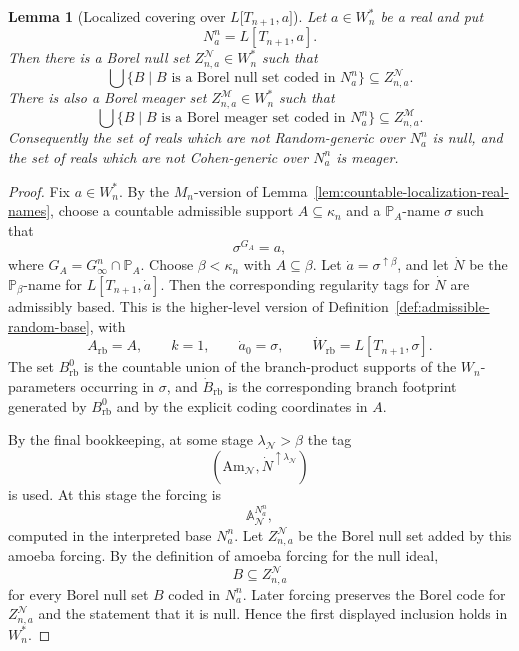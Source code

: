 \documentclass[a4paper,11pt]{article}
\newtheorem{lemma}[theorem]{Lemma}
\begin{document}
\begin{lemma}[Localized covering over \(L\lbrack T_{n+1},a\rbrack\)]\label{lem:random-cohen-covering-mn}
Let \(a\in W_n^\ast\) be a real and put
\[
   N^n_a=L[T_{n+1},a].
\]
Then there is a Borel null set \(Z^{\mathcal N}_{n,a}\in W_n^\ast\) such that
\[
   \bigcup\{B\mid B\text{ is a Borel null set coded in }N^n_a\}
   \subseteq Z^{\mathcal N}_{n,a}.
\]
There is also a Borel meager set \(Z^{\mathcal M}_{n,a}\in W_n^\ast\) such that
\[
   \bigcup\{B\mid B\text{ is a Borel meager set coded in }N^n_a\}
   \subseteq Z^{\mathcal M}_{n,a}.
\]
Consequently the set of reals which are not Random-generic over \(N^n_a\) is
null, and the set of reals which are not Cohen-generic over \(N^n_a\) is
meager.
\end{lemma}

\begin{proof}
Fix \(a\in W_n^\ast\).  By the \(M_n\)-version of
Lemma~\ref{lem:countable-localization-real-names}, choose a countable
admissible support \(A\subseteq\kappa_n\) and a \(\mathbb P_A\)-name
\(\sigma\) such that
\[
   \sigma^{G_A}=a,
\]
where \(G_A=G^n_\infty\cap\mathbb P_A\).  Choose \(\beta<\kappa_n\) with
\(A\subseteq\beta\).  Let \(\dot a=\sigma^{\uparrow\beta}\), and let
\(\dot N\) be the \(\mathbb P_\beta\)-name for \(L[T_{n+1},\dot a]\).
Then the corresponding regularity tags for \(\dot N\) are admissibly based.  This is the
higher-level version of Definition~\ref{def:admissible-random-base}, with
\[
   A_{\mathrm{rb}}=A,
   \qquad k=1,
   \qquad \dot a_0=\sigma,
   \qquad \dot W_{\mathrm{rb}}=L[T_{n+1},\sigma].
\]
The set \(B^0_{\mathrm{rb}}\) is the countable union of the branch-product
supports of the \(W_n\)-parameters occurring in \(\sigma\), and
\(\dot B_{\mathrm{rb}}\) is the corresponding branch footprint generated by
\(B^0_{\mathrm{rb}}\) and by the explicit coding coordinates in \(A\).

By the final bookkeeping, at some stage \(\lambda_{\mathcal N}>\beta\) the tag
\[
   (\mathrm{Am}_{\mathcal N},\dot N^{\uparrow\lambda_{\mathcal N}})
\]
is used.  At this stage the forcing is
\[
   \mathbb A_{\mathcal N}^{N^n_a},
\]
computed in the interpreted base \(N^n_a\).  Let \(Z^{\mathcal N}_{n,a}\) be
the Borel null set added by this amoeba forcing.  By the definition of amoeba
forcing for the null ideal,
\[
   B\subseteq Z^{\mathcal N}_{n,a}
\]
for every Borel null set \(B\) coded in \(N^n_a\).  Later forcing preserves
the Borel code for \(Z^{\mathcal N}_{n,a}\) and the statement that it is null.
Hence the first displayed inclusion holds in \(W_n^\ast\).


\end{proof}
\end{document}

